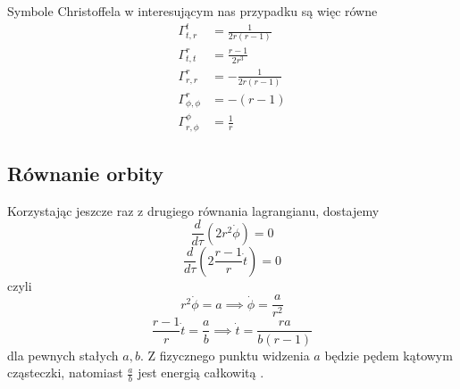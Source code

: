Symbole Christoffela w interesującym nas przypadku są więc równe
\begin{align*}
  \Gamma_{t,r}^t&=\frac{1}{2r(r-1)}\\ 
  \Gamma_{t,t}^r&=\frac{r-1}{2r^3}\\ 
  \Gamma_{r,r}^r&=-\frac{1}{2r(r-1)}\\ 
  \Gamma_{\phi,\phi}^r&=-(r-1)\\ 
  \Gamma_{r,\phi}^\phi&=\frac{1}{r} 
\end{align*}

\subsection{Równanie orbity}

Korzystając jeszcze raz z drugiego równania lagrangianu, dostajemy
$$ \frac{d}{d\tau}(2r^2\dot{\phi})=0 $$
$$ \frac{d}{d\tau}\left(2\frac{r-1}{r}\dot{t}\right)=0 $$
czyli 
$$ r^2\dot{\phi}=a \implies \dot{\phi}=\frac{a}{r^2}$$
$$ \frac{r-1}{r}\dot{t}=\frac{a}{b} \implies \dot{t}=\frac{ra}{b(r-1)}$$
dla pewnych stałych $a,b$. Z fizycznego punktu widzenia $a$ będzie pędem kątowym cząsteczki, natomiast $\frac{a}{b}$ jest energią całkowitą \cite{kolejnaFizyka}. 

%

